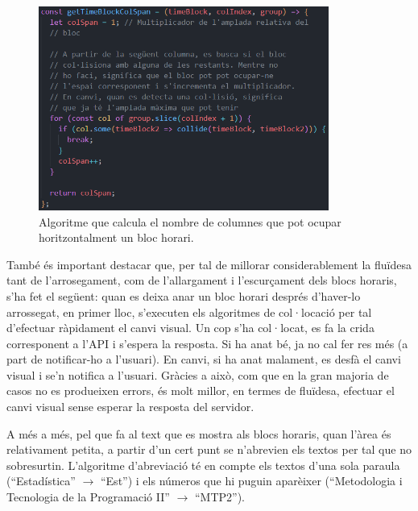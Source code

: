 \documentclass[a4paper,12pt]{ThesisStyle}
\begin{document}
\begin{figure}[H]
  \centering
  \includegraphics[width=0.85\textwidth]{assets/code/usabilitat/colSpan.png}
  \caption{\label{img:colspan} Algoritme que calcula el nombre de columnes que pot ocupar horitzontalment un bloc horari.}
\end{figure}

També és important destacar que, per tal de millorar considerablement la fluïdesa tant de l'arrosegament, com de l'allargament i l'escurçament dels blocs horaris, s'ha fet el següent: quan es deixa anar un bloc horari després d'haver-lo arrossegat, en primer lloc, s'executen els algoritmes de col·locació per tal d'efectuar ràpidament el canvi visual. Un cop s'ha col·locat, es fa la crida corresponent a l'API i s'espera la resposta. Si ha anat bé, ja no cal fer res més (a part de notificar-ho a l'usuari). En canvi, si ha anat malament, es desfà el canvi visual i se'n notifica a l'usuari. Gràcies a això, com que en la gran majoria de casos no es produeixen errors, és molt millor, en termes de fluïdesa, efectuar el canvi visual sense esperar la resposta del servidor.

A més a més, pel que fa al text que es mostra als blocs horaris, quan l'àrea és relativament petita, a partir d'un cert punt se n'abrevien els textos per tal que no sobresurtin. L'algoritme d'abreviació té en compte els textos d'una sola paraula (``Estadística'' $\rightarrow$ ``Est'') i els números que hi puguin aparèixer (``Metodologia i Tecnologia de la Programació II'' $\rightarrow$ ``MTP2'').
\end{document}
